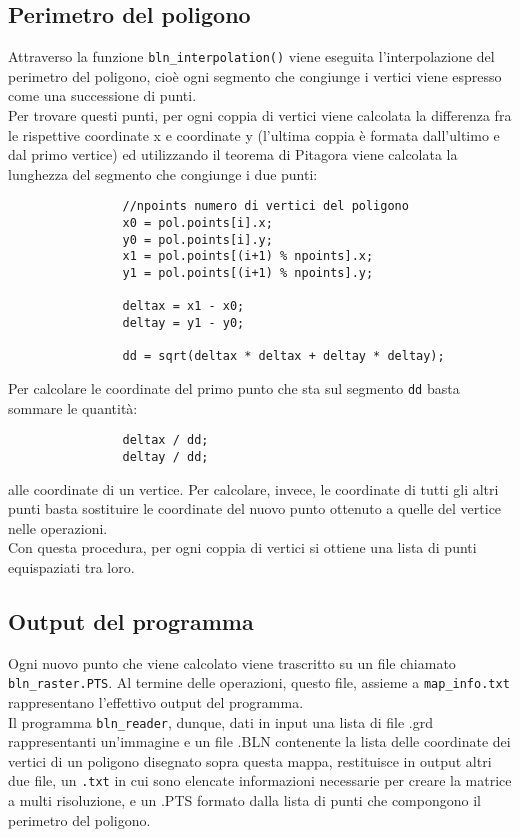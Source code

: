 		\subsection{Perimetro del poligono}
			Attraverso la funzione \texttt{bln\_interpolation()} viene eseguita l'interpolazione del perimetro del poligono, cio\`{e} ogni segmento che congiunge i vertici viene espresso come una successione di punti.\\
			Per trovare questi punti, per ogni coppia di vertici viene calcolata la differenza fra le rispettive coordinate x e coordinate y (l'ultima coppia \`{e} formata dall'ultimo e dal primo vertice) ed utilizzando il teorema di Pitagora viene calcolata la lunghezza del segmento che congiunge i due punti:
			\begin{verbatim}
				//npoints numero di vertici del poligono
				x0 = pol.points[i].x;
				y0 = pol.points[i].y;
				x1 = pol.points[(i+1) % npoints].x;
				y1 = pol.points[(i+1) % npoints].y;
				
				deltax = x1 - x0;
				deltay = y1 - y0;

				dd = sqrt(deltax * deltax + deltay * deltay);
			\end{verbatim}
			Per calcolare le coordinate del primo punto che sta sul segmento \texttt{dd} basta sommare le quantit\`{a}:
			\begin{verbatim}
				deltax / dd;
				deltay / dd;
			\end{verbatim} 
			alle coordinate di un vertice. Per calcolare, invece, le coordinate di tutti gli altri punti basta sostituire le coordinate del nuovo punto ottenuto a quelle del vertice nelle operazioni.\\ 
			Con questa procedura, per ogni coppia di vertici si ottiene una lista di punti equispaziati tra loro.

		\subsection{Output del programma}
			Ogni nuovo punto che viene calcolato viene trascritto su un file chiamato \texttt{bln\_raster.PTS}.
			Al termine delle operazioni, questo file, assieme a \texttt{map\_info.txt} rappresentano l'effettivo output del programma. \\
			Il programma \texttt{bln\_reader}, dunque, dati in input una lista di file .grd rappresentanti un'immagine e un file .BLN contenente la lista delle coordinate dei vertici di un poligono disegnato sopra questa mappa, restituisce in output altri due file, un \texttt{.txt} in cui sono elencate informazioni necessarie per creare la matrice a multi risoluzione, e un .PTS formato dalla lista di punti che compongono il perimetro del poligono.

